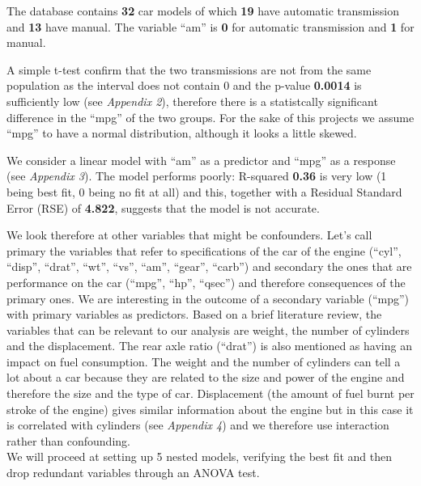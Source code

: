 \documentclass[]{article}
\begin{document}
The database contains \textbf{32} car models of which \textbf{19} have
automatic transmission and \textbf{13} have manual. The variable ``am''
is \textbf{0} for automatic transmission and \textbf{1} for manual.

A simple t-test confirm that the two transmissions are not from the same
population as the interval does not contain 0 and the p-value
\textbf{0.0014} is sufficiently low (see \emph{Appendix 2}), therefore
there is a statistcally significant difference in the ``mpg'' of the two
groups. For the sake of this projects we assume ``mpg'' to have a normal
distribution, although it looks a little skewed.

We consider a linear model with ``am'' as a predictor and ``mpg'' as a
response (see \emph{Appendix 3}). The model performs poorly: R-squared
\textbf{0.36} is very low (1 being best fit, 0 being no fit at all) and
this, together with a Residual Standard Error (RSE) of \textbf{4.822},
suggests that the model is not accurate.

We look therefore at other variables that might be confounders. Let's
call primary the variables that refer to specifications of the car of
the engine (``cyl'', ``disp'', ``drat'', ``wt'', ``vs'', ``am'',
``gear'', ``carb'') and secondary the ones that are performance on the
car (``mpg'', ``hp'', ``qsec'') and therefore consequences of the
primary ones. We are interesting in the outcome of a secondary variable
(``mpg'') with primary variables as predictors. Based on a brief
literature review, the variables that can be relevant to our analysis
are weight, the number of cylinders and the displacement. The rear axle
ratio (``drat'') is also mentioned as having an impact on fuel
consumption. The weight and the number of cylinders can tell a lot about
a car because they are related to the size and power of the engine and
therefore the size and the type of car. Displacement (the amount of fuel
burnt per stroke of the engine) gives similar information about the
engine but in this case it is correlated with cylinders (see
\emph{Appendix 4}) and we therefore use interaction rather than
confounding.\\We will proceed at setting up 5 nested models, verifying
the best fit and then drop redundant variables through an ANOVA test.
\end{document}
